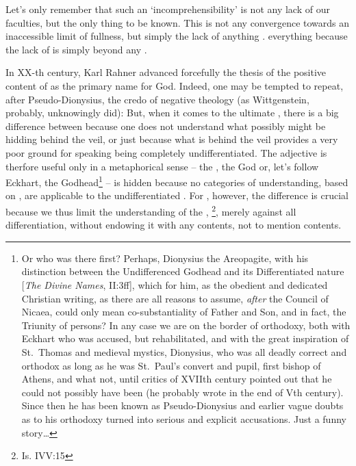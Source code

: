 \pa {}

Let's only remember that such an `incomprehensibility' is not
any lack of our faculties, but the only thing to be known. 
This  is not any convergence 
towards an inaccessible limit of fullness, but simply the lack of 
anything .   
everything because the lack of  is simply  
beyond any . 

\pa In XX-th century, Karl Rahner advanced forcefully the thesis of
the positive content of  as the primary name
for God.  Indeed, one may be tempted to repeat, after
Pseudo-Dionysius, the credo of negative theology (as Wittgenstein,
probably, unknowingly did): 
But, when it comes to the ultimate , there is a big
difference between  because one does not
understand what possibly might be hidding behind the veil, or just
because what is behind the veil provides a very poor ground for
speaking being completely undifferentiated.  The adjective
 is therfore useful only in a metaphorical sense -- the
, the God or, let's follow Eckhart, the Godhead\footnote{Or
who was there first?  Perhaps, Dionysius the Areopagite, with his
distinction between the Undifferenced Godhead and its Differentiated
nature [{\em The Divine Names}, II:3ff], which for him, as the obedient
and dedicated Christian writing, as there are all reasons to assume,
{\em after} the Council of Nicaea, could only mean co-substantiality
of Father and Son, and in fact, the Triunity of persons?  In any case
we are on the border of orthodoxy, both with Eckhart who was accused,
but rehabilitated, and with the great inspiration of St.~Thomas and
medieval mystics, Dionysius, who was all deadly correct and orthodox
as long as he was St.~Paul's convert and pupil, first bishop of
Athens, and what not, until critics of XVIIth century pointed out that 
he could not possibly have been (he probably wrote
in the end of Vth century).  Since then he has been
known as Pseudo-Dionysius and earlier vague doubts as to his orthodoxy 
turned into serious and explicit accusations.  Just a funny story\ldots}
%
-- is hidden
because no  categories of understanding, based on
, are applicable to the undifferentiated . 
For , however, the difference is crucial because we
thus limit the understanding of the , \footnote{Is. IVV:15 }, merely against all
differentiation, without endowing it with any contents, not to mention
 contents.


